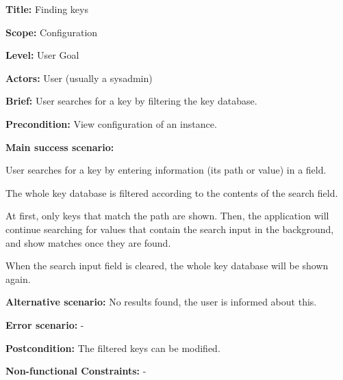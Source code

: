 
\begin{DoxyItemize}
\item {\bfseries{Title\+:}} Finding keys
\item {\bfseries{Scope\+:}} Configuration
\item {\bfseries{Level\+:}} User Goal
\item {\bfseries{Actors\+:}} User (usually a sysadmin)
\item {\bfseries{Brief\+:}} User searches for a key by filtering the key database.
\end{DoxyItemize}


\begin{DoxyItemize}
\item {\bfseries{Precondition\+:}} View configuration of an instance.
\item {\bfseries{Main success scenario\+:}}
\begin{DoxyItemize}
\item User searches for a key by entering information (its path or value) in a field.
\item The whole key database is filtered according to the contents of the search field.
\item At first, only keys that match the path are shown. Then, the application will continue searching for values that contain the search input in the background, and show matches once they are found.
\item When the search input field is cleared, the whole key database will be shown again.
\end{DoxyItemize}
\item {\bfseries{Alternative scenario\+:}} No results found, the user is informed about this.
\item {\bfseries{Error scenario\+:}} -\/
\item {\bfseries{Postcondition\+:}} The filtered keys can be modified.
\item {\bfseries{Non-\/functional Constraints\+:}} -\/ 
\end{DoxyItemize}